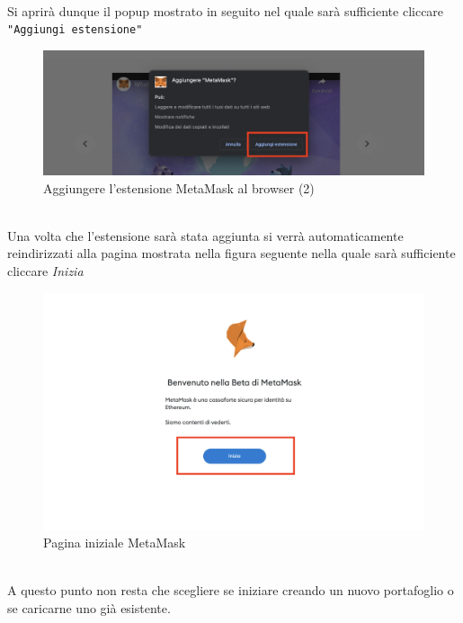 \textbf{}\\
Si aprirà dunque il popup mostrato in seguito nel quale sarà sufficiente cliccare \texttt{"Aggiungi estensione"}
\begin{figure}[H]
    \centering
    \includegraphics[scale=0.3]{immagini/AddExtenction.png}
    \caption{Aggiungere l'estensione MetaMask al browser (2)}
\end{figure}
\textbf{}\\
Una volta che l'estensione sarà stata aggiunta si verrà automaticamente reindirizzati alla pagina mostrata nella figura seguente nella quale sarà sufficiente cliccare \textit{Inizia}
\begin{figure}[H]
    \centering
    \includegraphics[scale=0.3]{immagini/startMetamask.png}
    \caption{Pagina iniziale MetaMask}
\end{figure}

\textbf{}\\
A questo punto non resta che scegliere se iniziare creando un nuovo portafoglio o se caricarne uno già esistente.

